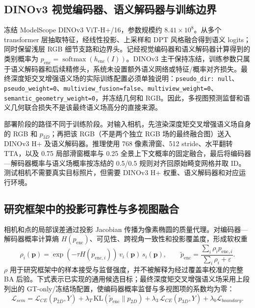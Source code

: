 \documentclass[UTF8,a4paper,11pt]{ctexart}
\begin{document}
\subsection{DINOv3 视觉编码器、语义解码器与训练边界}
冻结 ModelScope DINOv3 ViT-H+/16，参数规模约 $8.41\times10^8$。从多个 transformer 层抽取特征，经线性投影、上采样和 DPT 风格融合得到语义 logits；同时保留浅层 RGB 细节支路和边界头。记经视觉编码器和语义解码器计算得到的类别概率为 $p_{\mathrm{enc}}=\operatorname{softmax}(h_{\mathrm{enc}}(I))$。DINOv3 主干保持冻结，训练参数只属于语义解码器和后续精修头，系统未设置额外语义网络或特征/概率对齐损失。最终深度矩交叉增强语义场的实际训练配置必须单独说明：\texttt{pseudo\_dir: null}、\texttt{pseudo\_weight=0}、\texttt{multiview\_fusion=false}、\texttt{multiview\_weight=0}、\texttt{semantic\_geometry\_weight=0}，并冻结几何和 RGB。因此，多视图预测监督和语义几何联合损失不是该最终语义场高分的直接来源。

部署阶段的路径不同于训练阶段。对输入相机，先渲染深度矩交叉增强语义场自身的 RGB 和 $p_{3D}$；再把该 RGB（不是两个独立 RGB 场的最终融合图）送入 DINOv3 H+ 及语义解码器。推理使用 768 像素滑窗、512 stride、水平翻转 TTA，以及 0.75 局部滑窗概率与 0.25 全景上下文概率的固定融合，最后将编码器—解码器概率与语义场概率按冻结的 0.5/0.5 规则对齐回原始畸变网格并取 ID。测试相机不需要真实目标照片，但需要 DINOv3 H+ 权重、语义解码器和对应运行环境。

\subsection{研究框架中的投影可靠性与多视图融合}
相机和点的局部误差通过投影 Jacobian 传播为像素椭圆的质量代理。对编码器—解码器概率计算熵 $H(p_{\mathrm{enc}})$、可见性、跨视角一致性和投影覆盖度，形成软权重
\begin{equation}
  \rho_i(\mathbf p)=\exp(-\tau H(p_{\mathrm{enc},i}))\,v_i(\mathbf p)\,s_i(\mathbf p),
  \qquad
  \widetilde p_{\mathrm{enc}}=\frac{\sum_i\rho_i p_{\mathrm{enc},i}}{\sum_i\rho_i+\varepsilon}.
\end{equation}
$\rho$ 用于研究框架中的样本接受与监督强度，并不被解释为经过覆盖率校准的完整 BA 后验。下式表示已实现的通用候选目标；最终深度矩交叉增强语义场采用上段列出的 GT-only/冻结场配置，使编码器概率监督与多视图项的系数均为零：
\begin{equation}
\mathcal L_{sem}=\mathcal L_{CE}(p_{2D},Y)+\lambda_T\,\mathrm{KL}(\widetilde p_{\mathrm{enc}}\|p_{2D})
+\lambda_3\,\mathcal L_{CE}(p_{3D},Y)+\lambda_b\mathcal L_{boundary}.
\end{equation}
\end{document}

